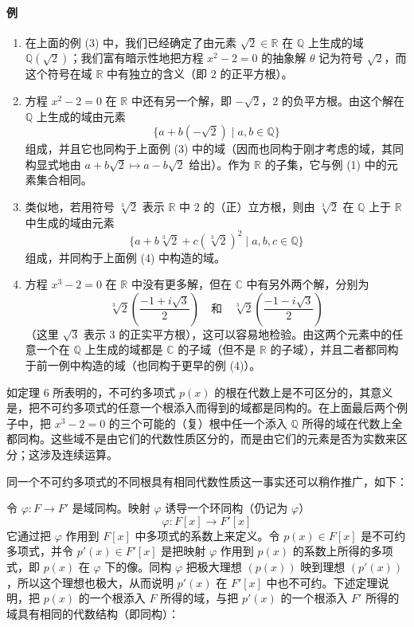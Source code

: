 \paragraph{例}
\begin{enumerate}[label=(\arabic*)]
	\item 在上面的例 (3) 中，我们已经确定了由元素 $\sqrt2\in\mathbb R$ 在 $\mathbb Q$ 上生成的域 $\mathbb Q(\sqrt2)$；我们富有暗示性地把方程 $x^2-2=0$ 的抽象解 $\theta$ 记为符号 $\sqrt2$，而这个符号在域 $\mathbb R$ 中有独立的含义（即 $2$ 的正平方根）。
	
	\item 方程 $x^2-2=0$ 在 $\mathbb R$ 中还有另一个解，即 $-\sqrt2$，$2$ 的负平方根。由这个解在 $\mathbb Q$ 上生成的域由元素
	\[
	\{a+b(-\sqrt2)\mid a,b\in\mathbb Q\}
	\]
	组成，并且它也同构于上面例 (3) 中的域（因而也同构于刚才考虑的域，其同构显式地由 $a+b\sqrt2\mapsto a-b\sqrt2$ 给出）。作为 $\mathbb R$ 的子集，它与例 (1) 中的元素集合相同。
	
	\item 类似地，若用符号 $\sqrt[3]{2}$ 表示 $\mathbb R$ 中 $2$ 的（正）立方根，则由 $\sqrt[3]{2}$ 在 $\mathbb Q$ 上于 $\mathbb R$ 中生成的域由元素
	\[
	\{a+b\sqrt[3]{2}+c(\sqrt[3]{2})^2\mid a,b,c\in\mathbb Q\}
	\]
	组成，并同构于上面例 (4) 中构造的域。
	
	\item 方程 $x^3-2=0$ 在 $\mathbb R$ 中没有更多解，但在 $\mathbb C$ 中有另外两个解，分别为
	\[
	\sqrt[3]{2}\left(\frac{-1+i\sqrt3}{2}\right)
	\quad\text{和}\quad
	\sqrt[3]{2}\left(\frac{-1-i\sqrt3}{2}\right)
	\]
	（这里 $\sqrt3$ 表示 $3$ 的正实平方根），这可以容易地检验。由这两个元素中的任意一个在 $\mathbb Q$ 上生成的域都是 $\mathbb C$ 的子域（但不是 $\mathbb R$ 的子域），并且二者都同构于前一例中构造的域（也同构于更早的例 (4)）。
\end{enumerate}

如定理 6 所表明的，不可约多项式 $p(x)$ 的根在代数上是不可区分的，其意义是，把不可约多项式的任意一个根添入而得到的域都是同构的。在上面最后两个例子中，把 $x^3-2=0$ 的三个可能的（复）根中任一个添入 $\mathbb Q$ 所得的域在代数上全都同构。这些域不是由它们的代数性质区分的，而是由它们的元素是否为实数来区分；这涉及连续运算。

同一个不可约多项式的不同根具有相同代数性质这一事实还可以稍作推广，如下：

令 $\varphi:F\to F'$ 是域同构。映射 $\varphi$ 诱导一个环同构（仍记为 $\varphi$）
\[
\varphi:F[x]\longrightarrow F'[x]
\]
它通过把 $\varphi$ 作用到 $F[x]$ 中多项式的系数上来定义。令 $p(x)\in F[x]$ 是不可约多项式，并令 $p'(x)\in F'[x]$ 是把映射 $\varphi$ 作用到 $p(x)$ 的系数上所得的多项式，即 $p(x)$ 在 $\varphi$ 下的像。同构 $\varphi$ 把极大理想 $(p(x))$ 映到理想 $(p'(x))$，所以这个理想也极大，从而说明 $p'(x)$ 在 $F'[x]$ 中也不可约。下述定理说明，把 $p(x)$ 的一个根添入 $F$ 所得的域，与把 $p'(x)$ 的一个根添入 $F'$ 所得的域具有相同的代数结构（即同构）：

